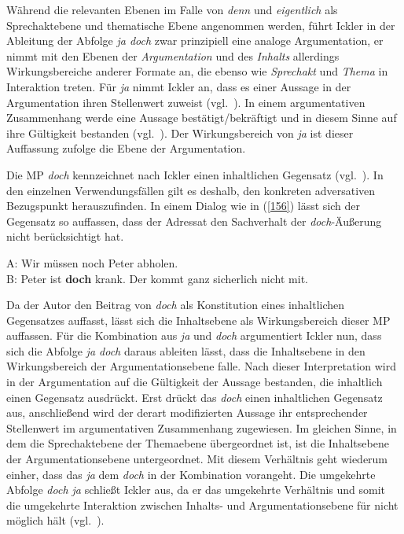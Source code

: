 Während die relevanten Ebenen im Falle von \textit{denn} und \textit{eigentlich} als Sprech\-aktebene und thematische Ebene angenommen werden, führt Ickler in der Ablei\-tung der Abfolge \textit{ja doch} zwar prinzipiell eine analoge Argumentation, er nimmt mit den Ebenen der \textit{Argumentation} und des \textit{Inhalts} allerdings Wirkungsbereiche anderer Formate an, die ebenso wie \textit{Sprechakt} und \textit{Thema} in Interaktion treten. Für \textit{ja} nimmt Ickler an, dass es einer Aussage in der Argumentation ihren Stellenwert zuweist (vgl.\ \citeyear[404]{Ickler1994}). In einem argumentativen Zusammenhang werde eine Aussage bestätigt/bekräftigt und in diesem Sinne auf ihre Gültigkeit bestanden (vgl.\ \citeyear[399]{Ickler1994}). Der Wirkungsbereich von \textit{ja} ist dieser Auffassung zufolge die Ebene der Argumentation. 
	
Die MP \textit{doch} kennzeichnet nach Ickler einen inhaltlichen Gegensatz (vgl.\ \citeyear[493]{Ickler1994}). In den einzelnen Verwendungsfällen gilt es deshalb, den konkreten adversativen Bezugspunkt herauszufinden. In einem Dialog wie in (\ref{156}) lässt sich der Gegensatz so auffassen, dass der Adressat den Sachverhalt der \textit{doch}-Äußerung nicht berücksichtigt hat.

\begin{exe}
	\ex\label{156} 
	A: Wir müssen noch Peter abholen.\\
	B: Peter ist \textbf{doch} krank. Der kommt ganz sicherlich nicht mit.
\end{exe}\pagebreak
Da der Autor den Beitrag von \textit{doch} als Konstitution eines inhaltlichen Gegensatzes auffasst, lässt sich die Inhaltsebene als Wirkungsbereich dieser MP auffassen. Für die Kombination aus \textit{ja} und \textit{doch} argumentiert Ickler nun, dass sich die Abfolge \textit{ja doch} daraus ableiten lässt, dass die Inhaltsebene in den Wirkungsbereich der Argumentationsebene falle. Nach dieser Interpretation wird in der Argumentation auf die Gültigkeit der Aussage bestanden, die inhaltlich einen Gegensatz ausdrückt. Erst drückt das \textit{doch} einen inhaltlichen Gegensatz aus, anschließend wird der derart modifizierten Aussage ihr entsprechender Stellenwert im argumentativen Zusammenhang zugewiesen. Im gleichen Sinne, in dem die Sprechaktebene der Themaebene übergeordnet ist, ist die Inhaltsebene der Argumentationsebene untergeordnet. Mit diesem Verhältnis geht wiederum einher, dass das \textit{ja} dem \textit{doch} in der Kombination vorangeht. Die umgekehrte Abfolge \textit{doch ja} schließt Ickler aus, da er das umgekehrte Verhältnis und somit die umgekehrte Interaktion zwischen Inhalts- und Argumentationsebene  für  nicht möglich hält (vgl.\ \citeyear[404]{Ickler1994}).

